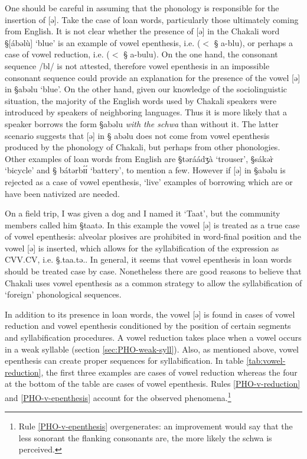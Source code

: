 One should be careful in assuming that  the  phonology   is responsible for
the insertion of  [ə].  Take the case of loan words,
particularly those ultimately coming  from  English. It is not clear whether the
presence of [ə] in the Chakali
word {\S [ábəlù]}  `blue'  is an example of vowel epenthesis, i.e.  ($<$ {\S
a-blu}),  or perhaps a case of vowel reduction, i.e.  ($<$ {\S
a-bulu}).  On the one hand, the 
consonant sequence  /bl/ is not attested, therefore  vowel
epenthesis 
in an impossible consonant sequence  could  provide an explanation for the
presence
of  the vowel [ə] in {\S abəlu} `blue'.  On the other hand, given our knowledge
of the sociolinguistic situation,  the majority of the English
words used by Chakali speakers   were introduced by speakers of neighboring
languages. Thus it is more likely that a speaker borrows the form {\S abəlu}
{\it with
the schwa}  than without it. The latter scenario suggests that  [ə] in {\S
abəlu} does not come from vowel epenthesis produced by the phonology of Chakali,
but perhaps from other phonologies.  Other examples
of loan words from
English are {\S təráádʒà} `trouser',  {\S sákər̀} `bicycle' and  {\S
bátərbɪ́ɪ́} `battery', to mention a few. However if   [ə]  in
{\S abəlu} is rejected as a case of vowel epenthesis,
  `live' examples of borrowing  which are or have been nativized are needed.

On a field trip, I was given a dog  and I named it  `Taat',
but the 
community members
called him {\S taatə}. In this example  the  vowel  [ə] is treated as a true
case
of vowel epenthesis: alveolar plosives are prohibited in word-final position and
the   vowel  [ə] is  inserted, which allows for the syllabification of the
expression as CVV.CV, i.e. {\S .taa.tə.}.  In general, it seems that vowel
epenthesis in loan words should be treated case by case. Nonetheless there are
good reasons to believe that Chakali uses vowel epenthesis as a common strategy
to allow the syllabification of  `foreign' phonological sequences. 




In addition to its presence in loan words, the   vowel  [ə] is found  in cases
of vowel reduction  and vowel epenthesis  conditioned by the
position of certain segments and 
syllabification procedures. A vowel reduction takes place when a vowel occurs 
in a weak
syllable (section \ref{sec:PHO-weak-syll}).   Also, as  mentioned above, vowel
epenthesis can create proper sequences for syllabification.  In table
\ref{tab:vowel-reduction},  the first three examples are cases of vowel
reduction
whereas the four at the bottom of the table are cases of vowel epenthesis.
Rules \ref{PHO-v-reduction}  and \ref{PHO-v-epenthesis} account for the observed
phenomena.\footnote{Rule \ref{PHO-v-epenthesis} overgenerates: an
improvement would say that the less sonorant the flanking consonants are, the
more likely the schwa is perceived.} 



